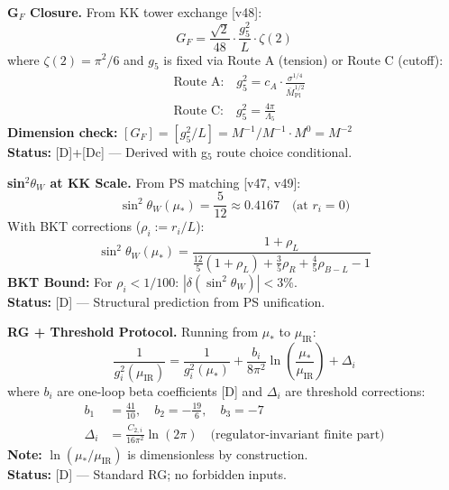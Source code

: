 \documentclass[11pt,a4paper]{article}
\theoremstyle{definition}
\begin{document}
\begin{resultbox}
\textbf{G$_F$ Closure.} From KK tower exchange [v48]:
\begin{equation}
\label{eq:R2_GF}
\boxed{G_F = \frac{\sqrt{2}}{48} \cdot \frac{g_5^2}{L} \cdot \zeta(2)}
\end{equation}
where $\zeta(2) = \pi^2/6$ and $g_5$ is fixed via Route A (tension) or Route C (cutoff):
\begin{align}
\label{eq:R2_g5_routes}
&\text{Route A:} \quad g_5^2 = c_A \cdot \frac{\sigma^{1/4}}{\bar{M}_{\text{Pl}}^{1/2}} \\
\label{eq:R2_g5_routeC}
&\text{Route C:} \quad g_5^2 = \frac{4\pi}{\Lambda_5}
\end{align}
\textbf{Dimension check:} $[G_F] = [g_5^2/L] = M^{-1}/M^{-1} \cdot M^0 = M^{-2}$ \checkmark\\
\textbf{Status:} [D]+[Dc] --- Derived with g$_5$ route choice conditional.
\end{resultbox}

\begin{resultbox}
\textbf{sin$^2\theta_W$ at KK Scale.} From PS matching [v47, v49]:
\begin{equation}
\label{eq:R3_sw2}
\boxed{\sin^2\theta_W(\mu_*) = \frac{5}{12} \approx 0.4167 \quad \text{(at } r_i = 0\text{)}}
\end{equation}
With BKT corrections ($\rho_i := r_i/L$):
\begin{equation}
\label{eq:R3_sw2_bkt}
\sin^2\theta_W(\mu_*) = \frac{1 + \rho_L}{\frac{12}{5}(1 + \rho_L) + \frac{3}{5}\rho_R + \frac{4}{5}\rho_{B-L} - 1}
\end{equation}
\textbf{BKT Bound:} For $\rho_i < 1/100$: $|\delta(\sin^2\theta_W)| < 3\%$.\\
\textbf{Status:} [D] --- Structural prediction from PS unification.
\end{resultbox}

\begin{resultbox}
\textbf{RG + Threshold Protocol.} Running from $\mu_*$ to $\mu_{\text{IR}}$:
\begin{equation}
\label{eq:R4_running}
\boxed{\frac{1}{g_i^2(\mu_{\text{IR}})} = \frac{1}{g_i^2(\mu_*)} + \frac{b_i}{8\pi^2}\ln\left(\frac{\mu_*}{\mu_{\text{IR}}}\right) + \Delta_i}
\end{equation}
where $b_i$ are one-loop beta coefficients [D] and $\Delta_i$ are threshold corrections:
\begin{align}
\label{eq:R4_beta}
b_1 &= \frac{41}{10}, \quad b_2 = -\frac{19}{6}, \quad b_3 = -7 \\
\label{eq:R4_threshold}
\Delta_i &= \frac{C_{2,i}}{16\pi^2}\ln(2\pi) \quad \text{(regulator-invariant finite part)}
\end{align}
\textbf{Note:} $\ln(\mu_*/\mu_{\text{IR}})$ is dimensionless by construction.\\
\textbf{Status:} [D] --- Standard RG; no forbidden inputs.
\end{resultbox}
\end{document}
